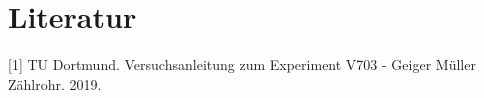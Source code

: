 \section{Literatur}

[1] TU Dortmund. Versuchsanleitung zum Experiment V703 - Geiger Müller Zählrohr. 2019.